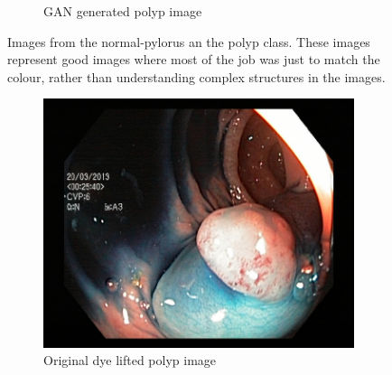 \begin{figure}
\begin{subfigure}[t]{\myfigsizethree}
            \caption{GAN generated polyp image}    
            \label{fig:p_GAN_both1}
        \end{subfigure}
        \caption{Images from the normal-pylorus an the polyp class. These images represent good images where most of the job was just to match the colour, rather than understanding complex structures in the images.} 
        \label{fig:AE_GAN_BOTH1}
    \end{figure}
    
    \begin{figure}
            \tiny
        \begin{subfigure}[t]{\myfigsizethree}
            \centering
            \includegraphics[height=\textwidth ,width=\textwidth]{experiments/figures/both/DLORIG.jpg}
            \caption{Original dye lifted polyp image}    
            \label{fig:dlp_ORIG_BOTH2}
        \end{subfigure}
        \qquad
        \begin{subfigure}[t]{\myfigsizethree}
            \centering

\end{subfigure}
\end{figure}
